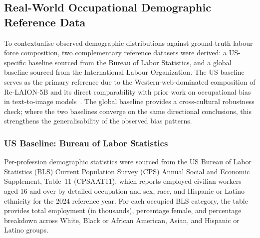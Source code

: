 
\subsection{Real-World Occupational Demographic Reference Data}
\label{subsec:bls_reference}

To contextualise observed demographic distributions against ground-truth labour force
composition, two complementary reference datasets were derived: a US-specific baseline
sourced from the Bureau of Labor Statistics, and a global baseline sourced from the
International Labour Organization. The US baseline serves as the primary reference due
to the Western-web-dominated composition of Re-LAION-5B and its direct comparability
with prior work on occupational bias in text-to-image models~\cite{Bianchi_2023_EasilyAccessibleTextToImageModels,
	Luccioni_2023_AnalyzingSocietalRepresentationsDiffusionModels}. The global baseline
provides a cross-cultural robustness check; where the two baselines converge on the
same directional conclusions, this strengthens the generalisability of the observed
bias patterns.

\subsubsection{US Baseline: Bureau of Labor Statistics}

Per-profession demographic statistics were sourced from the US Bureau of Labor
Statistics (BLS) Current Population Survey (CPS) Annual Social and Economic
Supplement, Table~11 (CPSAAT11), which reports employed civilian workers aged 16 and
over by detailed occupation and sex, race, and Hispanic or Latino ethnicity for the 2024
reference year. For each occupied BLS category, the table provides total employment (in
thousands), percentage female, and percentage breakdown across White, Black or African
American, Asian, and Hispanic or Latino groups.

